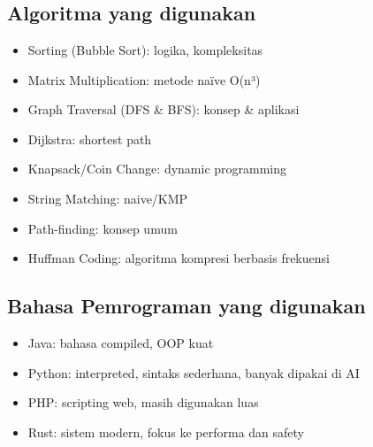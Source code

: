 \chapter{\babDua}
\label{bab:2}


\section{Algoritma yang digunakan}
\label{sec:algoritma}
\begin{itemize}
	\item Sorting (Bubble Sort): logika, kompleksitas
	\item Matrix Multiplication: metode naïve O(n³)
	\item Graph Traversal (DFS & BFS): konsep & aplikasi
	\item Dijkstra: shortest path
	\item Knapsack/Coin Change: dynamic programming
	\item String Matching: naive/KMP
	\item Path-finding: konsep umum
	\item Huffman Coding: algoritma kompresi berbasis frekuensi
\end{itemize}

\section{Bahasa Pemrograman yang digunakan}
\label{sec:bahasaPemrograman}
\begin{itemize}
	\item Java: bahasa compiled, OOP kuat
	\item Python: interpreted, sintaks sederhana, banyak dipakai di AI
	\item PHP: scripting web, masih digunakan luas
	\item Rust: sistem modern, fokus ke performa dan safety
\end{itemize}


